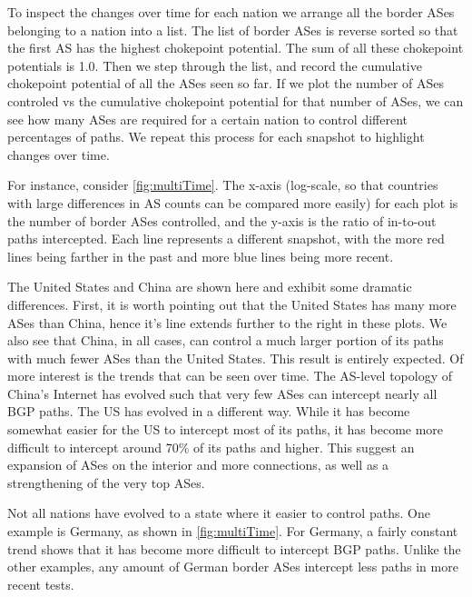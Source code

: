 \par
To inspect the changes over time for each nation we arrange all the border ASes belonging to a nation into a list. The list of border ASes is reverse sorted
so that the first AS has the highest chokepoint potential. The sum of all these chokepoint potentials is 1.0. Then we step through the list, and record
the cumulative chokepoint potential of all the ASes seen so far. If we plot the number of ASes controled vs the cumulative chokepoint potential for that number
of ASes, we can see how many ASes are required for a certain nation to control different percentages of paths. We repeat this process for each snapshot to highlight
changes over time.

\par
For instance, consider \figurename \ref{fig:multiTime}. 
The x-axis (log-scale, so that countries with large differences in AS counts can be compared more easily) for each plot
is the number of border ASes controlled, and the y-axis is the ratio of in-to-out paths intercepted. Each line represents a different snapshot, with the more red lines being
farther in the past and more blue lines being more recent.

\par
The United States and China are shown here and exhibit some dramatic differences. First, it is worth pointing out that the United States has many more ASes than China, hence
it's line extends further to the right in these plots. We also see that China, in all cases, can control a much larger portion of its paths with much fewer ASes than the
United States. This result is entirely expected. Of more interest is the trends that can be seen over time. The AS-level topology of China's Internet has evolved such that very few
ASes can intercept nearly all BGP paths. The US has evolved in a different way. While it has become somewhat easier for the US to intercept most of its paths, it has become
more difficult to intercept around 70\% of its paths and higher. This suggest an expansion of ASes on the interior and more connections, as well as a strengthening of
the very top ASes.

\par
Not all nations have evolved to a state where it easier to control paths. One example is Germany, as shown in \figurename \ref{fig:multiTime}. For Germany, a fairly constant
trend shows that it has become more difficult to intercept BGP paths. Unlike the other examples, any amount of German border ASes intercept less paths in more recent tests.

